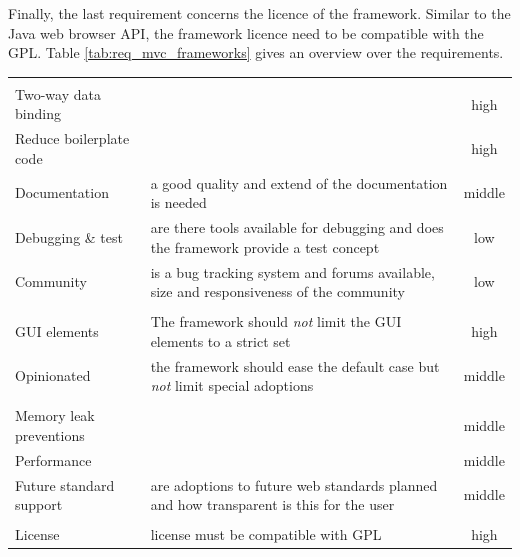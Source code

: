 Finally, the last requirement concerns the licence of the framework.
Similar to the Java web browser API, the framework licence need to be compatible with the GPL.
Table \ref{tab:req_mvc_frameworks} gives an overview over the requirements.\\

\begin{minipage}{\linewidth}
	\centering
	\label{tab:req_mvc_frameworks}
	\begin{tabulary}{\textwidth}{|L|L|C|}
		\hline 
		 &  &  \tabularnewline		
		\hline
		\\
 		\hline
		Two-way data binding&  & high\tabularnewline
		\hline
		Reduce boilerplate code & & high\tabularnewline
		\hline
	 	Documentation & a good quality and extend of the documentation is needed & middle\tabularnewline
	 	\hline
	 	Debugging \& test & are there tools available for debugging and does the framework provide a test concept & low\tabularnewline
	  	\hline
	 	Community & is a bug tracking system and forums available, size and responsiveness of the community & low\tabularnewline
		\hline
	 	\tabularnewline
 		\hline
    		GUI elements & The framework should \emph{not} limit the GUI elements to a strict set & high\tabularnewline
    		\hline
		Opinionated & the framework should ease the default case but \emph{not} limit special adoptions & middle\tabularnewline
		\hline
	 	\tabularnewline
 		\hline
		Memory leak preventions & & middle \tabularnewline
	 	\hline
		Performance &  & middle\tabularnewline
	 	\hline
		Future standard support& are adoptions to future web standards planned and how transparent is this for the user & middle\tabularnewline
		\hline
	 	\tabularnewline
 		\hline
		License & license must be compatible with GPL & high\tabularnewline
 		\hline
 	\end{tabulary}
\end{minipage}

